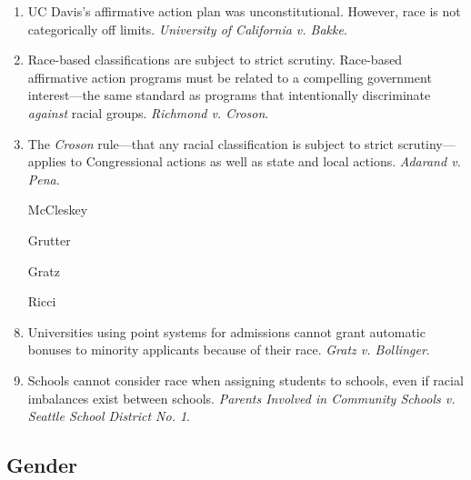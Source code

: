\begin{enumerate}
\begin{enumerate}
        \item ``Departures from the normal procedural 
        sequence.''\footnote{Casebook p. 1040.}
        \item Substantive departures from normal procedure.
        \item Legislative or administrative history.
    \end{enumerate}
    \item UC Davis's affirmative action plan was unconstitutional. However, 
    race is not categorically off limits. \emph{University of California v. 
    Bakke}. %
    \item Race-based classifications are subject to strict scrutiny. 
    Race-based affirmative action programs must be related to a compelling 
    government interest---the same standard as programs that intentionally 
    discriminate \emph{against} racial groups. \emph{Richmond v. Croson}.
    \item The \emph{Croson} rule---that any racial classification is subject 
    to strict scrutiny---applies to Congressional actions as well as state and 
    local actions. \emph{Adarand v. Pena}.
    \item [McCleskey] %
    \item [Grutter] %
    \item [Gratz] %
    \item [Ricci] %
    \item Universities using point systems for admissions cannot grant 
    automatic bonuses to minority applicants because of their race. 
    \emph{Gratz v. Bollinger}.
    \item Schools cannot consider race when assigning students to schools, 
    even if racial imbalances exist between schools. \emph{Parents Involved in 
    Community Schools v. Seattle School District No. 1}.
\end{enumerate}

\subsection{Gender}

